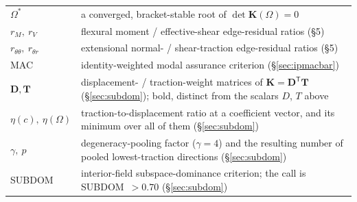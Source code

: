 \documentclass[11pt]{article}
\begin{document}
\begin{table}[h]
\begin{tabularx}{\linewidth}{@{}lX@{}}
$\Omega^{*}$ & a converged, bracket-stable root of $\det\mathbf{K}(\Omega)=0$\\
$r_M,\ r_V$ & flexural moment / effective-shear edge-residual ratios (\S5)\\
$r_{\theta\theta},\ r_{\theta r}$ & extensional normal- / shear-traction edge-residual ratios (\S5)\\
MAC & identity-weighted modal assurance criterion (\S\ref{sec:ipmacbar})\\
$\mathbf{D},\mathbf{T}$ & displacement- / traction-weight matrices of $\mathbf{K}=\mathbf{D}^{\mathsf T}\mathbf{T}$ (\S\ref{sec:subdom}); bold, distinct from the scalars $D$, $T$ above\\
$\eta(c),\ \eta(\Omega)$ & traction-to-displacement ratio at a coefficient vector, and its minimum over all of them (\S\ref{sec:subdom})\\
$\gamma,\ p$ & degeneracy-pooling factor ($\gamma=4$) and the resulting number of pooled lowest-traction directions (\S\ref{sec:subdom})\\
SUBDOM & interior-field subspace-dominance criterion; the call is SUBDOM~$>0.70$ (\S\ref{sec:subdom})\\
\bottomrule
\end{tabularx}
\renewcommand{\arraystretch}{1}
\end{table}
\end{document}

